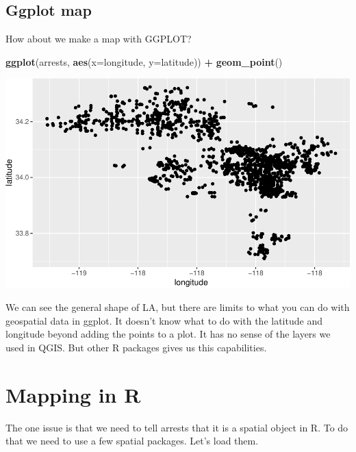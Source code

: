 \documentclass[]{book}
\newenvironment{Shaded}{\begin{snugshade}}{\end{snugshade}}
\newcommand{\DataTypeTok}[1]{\textcolor[rgb]{0.13,0.29,0.53}{#1}}
\newcommand{\KeywordTok}[1]{\textcolor[rgb]{0.13,0.29,0.53}{\textbf{#1}}}
\newcommand{\NormalTok}[1]{#1}
\newcommand{\OperatorTok}[1]{\textcolor[rgb]{0.81,0.36,0.00}{\textbf{#1}}}
\newcommand{\StringTok}[1]{\textcolor[rgb]{0.31,0.60,0.02}{#1}}
\begin{document}
\hypertarget{ggplot-map}{%
\subsection{Ggplot map}\label{ggplot-map}}

How about we make a map with GGPLOT?

\begin{Shaded}
\begin{Highlighting}[]
\KeywordTok{ggplot}\NormalTok{(arrests, }\KeywordTok{aes}\NormalTok{(}\DataTypeTok{x=}\NormalTok{longitude, }\DataTypeTok{y=}\NormalTok{latitude)) }\OperatorTok{+}\StringTok{ }\KeywordTok{geom_point}\NormalTok{()}
\end{Highlighting}
\end{Shaded}

\begin{center}\includegraphics[width=\textwidth]{afam-188r_files/figure-latex/unnamed-chunk-12-1} \end{center}

We can see the general shape of LA, but there are limits to what you can do with geospatial data in ggplot. It doesn't know what to do with the latitude and longitude beyond adding the points to a plot. It has no sense of the layers we used in QGIS. But other R packages gives us this capabilities.

\hypertarget{mapping-in-r}{%
\section{Mapping in R}\label{mapping-in-r}}

The one issue is that we need to tell arrests that it is a spatial object in R. To do that we need to use a few spatial packages. Let's load them.
\end{document}
